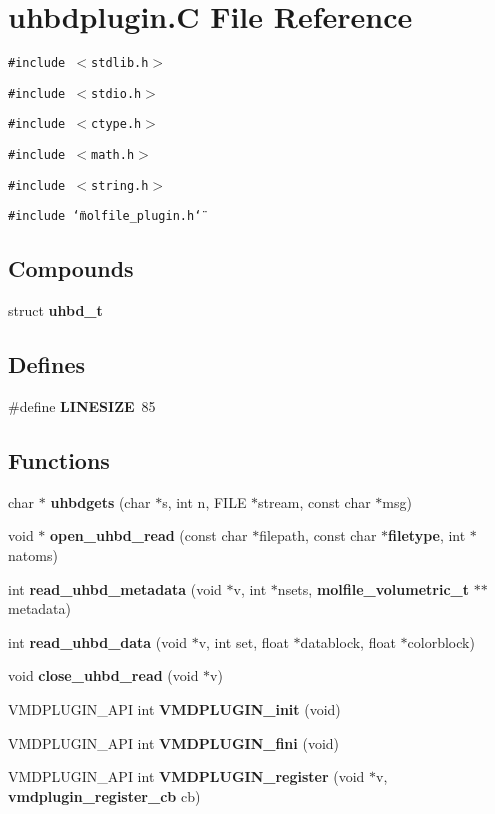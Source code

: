 \section{uhbdplugin.C File Reference}
\label{uhbdplugin_8C}
{\tt \#include $<$stdlib.h$>$}\par
{\tt \#include $<$stdio.h$>$}\par
{\tt \#include $<$ctype.h$>$}\par
{\tt \#include $<$math.h$>$}\par
{\tt \#include $<$string.h$>$}\par
{\tt \#include \char`\"{}molfile\_\-plugin.h\char`\"{}}\par
\subsection*{Compounds}
\begin{CompactItemize}
\item 
struct {\bf uhbd\_\-t}
\end{CompactItemize}
\subsection*{Defines}
\begin{CompactItemize}
\item 
\#define {\bf LINESIZE}\ 85
\end{CompactItemize}
\subsection*{Functions}
\begin{CompactItemize}
\item 
char $\ast$ {\bf uhbdgets} (char $\ast$s, int n, FILE $\ast$stream, const char $\ast$msg)
\item 
void $\ast$ {\bf open\_\-uhbd\_\-read} (const char $\ast$filepath, const char $\ast${\bf filetype}, int $\ast$natoms)
\item 
int {\bf read\_\-uhbd\_\-metadata} (void $\ast$v, int $\ast$nsets, {\bf molfile\_\-volumetric\_\-t} $\ast$$\ast$metadata)
\item 
int {\bf read\_\-uhbd\_\-data} (void $\ast$v, int set, float $\ast$datablock, float $\ast$colorblock)
\item 
void {\bf close\_\-uhbd\_\-read} (void $\ast$v)
\item 
VMDPLUGIN\_\-API int {\bf VMDPLUGIN\_\-init} (void)
\item 
VMDPLUGIN\_\-API int {\bf VMDPLUGIN\_\-fini} (void)
\item 
VMDPLUGIN\_\-API int {\bf VMDPLUGIN\_\-register} (void $\ast$v, {\bf vmdplugin\_\-register\_\-cb} cb)
\end{CompactItemize}
